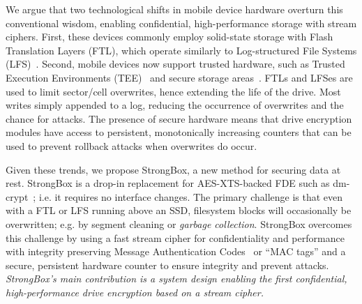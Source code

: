 We argue that two technological shifts in mobile device hardware overturn this
conventional wisdom, enabling confidential, high-performance storage with stream
ciphers. First, these devices commonly employ solid-state storage with Flash
Translation Layers (FTL), which operate similarly to Log-structured File Systems
(LFS)~\cite{LFS,F2FS,NILFS}. Second, mobile devices now support trusted
hardware, such as Trusted Execution Environments (TEE)~\cite{TEE,TrustZone} and
secure storage areas~\cite{eMMC-standard}. FTLs and LFSes are used to limit
sector/cell overwrites, hence extending the life of the drive. Most writes
simply appended to a log, reducing the occurrence of overwrites and the chance
for attacks. The presence of secure hardware means that drive encryption modules
have access to persistent, monotonically increasing counters that can be used to
prevent rollback attacks when overwrites do occur.

Given these trends, we propose StrongBox, a new method for securing data at
rest. StrongBox is a drop-in replacement for AES-XTS-backed FDE such as
dm-crypt~\cite{dmcrypt}; i.e. it requires no interface changes. The primary
challenge is that even with a FTL or LFS running above an SSD, filesystem blocks
will occasionally be overwritten; e.g. by segment cleaning or \emph{garbage
collection}. StrongBox overcomes this challenge by using a fast stream cipher
for confidentiality and performance with integrity preserving Message
Authentication Codes~\cite{MAC} or ``MAC tags'' and a secure, persistent
hardware counter to ensure integrity and prevent attacks. \emph{StrongBox's main
contribution is a system design enabling the first confidential,
high-performance drive encryption based on a stream cipher.}
